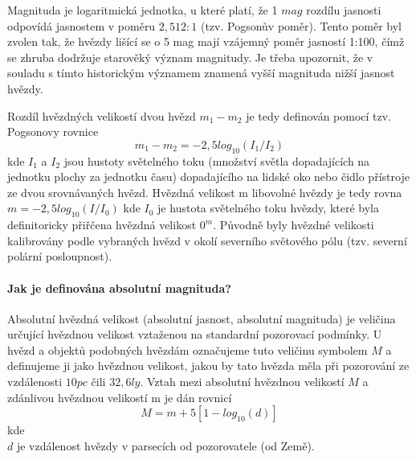 \documentclass[11pt,a4paper,notitlepage]{article}
\begin{document}
Magnituda je logaritmická jednotka, u které platí, že 1 $ mag $ rozdílu jasnosti odpovídá
jasnostem v poměru $ 2,512:1 $ (tzv. Pogsonův poměr). Tento poměr byl zvolen tak, že hvězdy
lišící se o 5 mag mají vzájemný poměr jasností 1:100, čímž se zhruba dodržuje starověký 
význam magnitudy. Je třeba upozornit, že v souladu s tímto historickým významem znamená 
vyšší magnituda nižší jasnost hvězdy.

Rozdíl hvězdných velikostí dvou hvězd $ m_1 − m_2 $ je tedy definován pomocí tzv.
Pogsonovy rovnice
\[ m_1 − m_2 = −2,5 log_{10}(I_1/I_2) \]
kde $ I_1 $ a $ I_2 $ jsou hustoty světelného toku (množství světla dopadajících na jednotku
plochy za jednotku času) dopadajícího na lidské oko nebo čidlo přístroje ze dvou srovnávaných
hvězd. Hvězdná velikost m libovolné hvězdy je tedy rovna
$ m = −2,5 log_{10}(I/I_0) $
kde $ I_0 $ je hustota světelného toku hvězdy, které byla definitoricky přiřčena hvězdná
velikost $ 0^m $. Původně byly hvězdné velikosti kalibrovány podle vybraných hvězd v okolí
severního světového pólu (tzv. severní polární posloupnost).
\paragraph{Jak je definována absolutní magnituda?}
Absolutní hvězdná velikost (absolutní jasnost, absolutní magnituda) je veličina určující
hvězdnou velikost vztaženou na standardní pozorovací podmínky.
U hvězd a objektů podobných hvězdám označujeme tuto veličinu symbolem $ M $ a definujeme
ji jako hvězdnou velikost, jakou by tato hvězda měla při pozorování ze vzdálenosti 
$ 10pc $ čili $ 32,6ly $. Vztah mezi absolutní hvězdnou velikostí $ M $ a zdánlivou 
hvězdnou velikostí m je dán rovnicí
\[ M = m + 5 [1 − log_{10}(d)] \]
kde\\
$ d $ je vzdálenost hvězdy v parsecích od pozorovatele (od Země).
\end{document}
